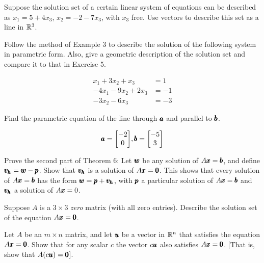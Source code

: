 \documentclass{../mathhomework}
\newenvironment{Mat}{\begin{bmatrix}}{\end{bmatrix}}
\begin{document}
\begin{problem}[1.5\#13]
    Suppose the solution set of a certain linear system of equations can be described as $x_1 = 5 + 4x_3$, $x_2 = -2 -7x_3$, with $x_3$ free. Use vectors to describe this set as a line in $\mathbb{R}^3$.
\end{problem}

\begin{problem}[1.5\#15]
    Follow the method of Example 3 to describe the solution  of the following system in parametric form. 
    Also, give a geometric description of the solution set and compare it to that in Exercise 5.

    \begin{align*}
        x_1 + 3x_2 + x_3 & = 1 \\
        -4x_1 - 9x_2 + 2x_3 & = -1 \\
        -3x_2 - 6x_3 &= -3
    \end{align*}
\end{problem}

\begin{problem}[1.5\#19]
    Find the parametric equation of the line through $\pmb{a}$ and parallel to $\pmb{b}$.

    \begin{equation*}
        \Vect{a} = \begin{Mat}
            -2 \\ 0
        \end{Mat}, \Vect{b} = \begin{Mat}
            -5 \\ 3
        \end{Mat}
    \end{equation*}
\end{problem}

\begin{problem}[1.5\#25]
    Prove the second part of Theorem 6: Let $\pmb{w}$ be any solution of $A\pmb{x} = \pmb{b}$, and define $\pmb{v_h} = \pmb{w} - \pmb{p}$. Show that $\pmb{v_h}$ is a solution of $A\pmb{x} = \pmb{0}$.
    This shows that every solution of $A\pmb{x} = \pmb{b}$ has the form $\pmb{w} = \pmb{p} + \pmb{v_h}$, with $\pmb{p}$ a particular solution of $A\pmb{x} = \pmb{b}$ and $\pmb{v_h}$ a solution of $A\pmb{x} = 0$.
\end{problem}

\begin{problem}[1.5\#27]
    Suppose $A$ is a $3 \times 3$ \textit{zero} matrix (with all zero entries). Describe the solution set of the equation $A\pmb{x} = \pmb{0}$.
\end{problem}

\begin{problem}[1.5\#39s]
    Let $A$ be an $m \times n$ matrix, and let $\pmb{u}$ be a vector in $\mathbb{R}^n$ that satisfies the equation $A\pmb{x} = \pmb{0}$. Show that for any scalar $c$ the vector $c\pmb{u}$ also satisfies $A\pmb{x} = \pmb{0}$. [That is, show that $A(c\pmb{u}) = \pmb{0}$].
\end{problem}
\end{document}
